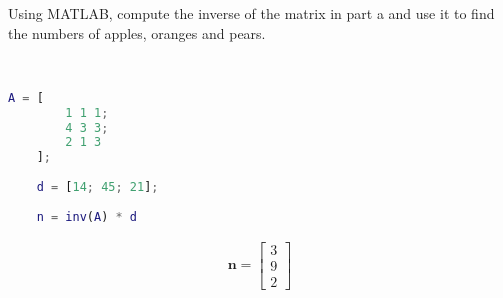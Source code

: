 Using MATLAB, compute the inverse of the matrix in part a and use it to find the numbers of apples, oranges and pears.

\begin{solution} \
    \begin{lstlisting}[language=Matlab]
    A = [
        1 1 1;
        4 3 3;
        2 1 3
    ];
    
    d = [14; 45; 21];
    
    n = inv(A) * d
    \end{lstlisting}
    
    \begin{align*}
        \boldsymbol{n} = \begin{bmatrix}
            3 \\ 9 \\ 2
        \end{bmatrix}
    \end{align*}
\end{solution}